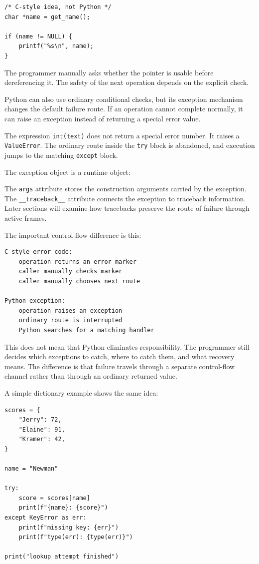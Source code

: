 \begin{verbatim}
/* C-style idea, not Python */
char *name = get_name();

if (name != NULL) {
    printf("%s\n", name);
}
\end{verbatim}

The programmer manually asks whether the pointer is usable before dereferencing it. The safety of the next operation depends on the explicit check.

Python can also use ordinary conditional checks, but its exception mechanism changes the default failure route. If an operation cannot complete normally, it can raise an exception instead of returning a special error value.

The expression \texttt{int(text)} does not return a special error number. It raises a \texttt{ValueError}. The ordinary route inside the \texttt{try} block is abandoned, and execution jumps to the matching \texttt{except} block.

The exception object is a runtime object:

The \texttt{args} attribute stores the construction arguments carried by the exception. The \texttt{\_\_traceback\_\_} attribute connects the exception to traceback information. Later sections will examine how tracebacks preserve the route of failure through active frames.

The important control-flow difference is this:

\begin{verbatim}
C-style error code:
    operation returns an error marker
    caller manually checks marker
    caller manually chooses next route

Python exception:
    operation raises an exception
    ordinary route is interrupted
    Python searches for a matching handler
\end{verbatim}

This does not mean that Python eliminates responsibility. The programmer still decides which exceptions to catch, where to catch them, and what recovery means. The difference is that failure travels through a separate control-flow channel rather than through an ordinary returned value.

A simple dictionary example shows the same idea:

\begin{verbatim}
scores = {
    "Jerry": 72,
    "Elaine": 91,
    "Kramer": 42,
}

name = "Newman"

try:
    score = scores[name]
    print(f"{name}: {score}")
except KeyError as err:
    print(f"missing key: {err}")
    print(f"type(err): {type(err)}")

print("lookup attempt finished")
\end{verbatim}

